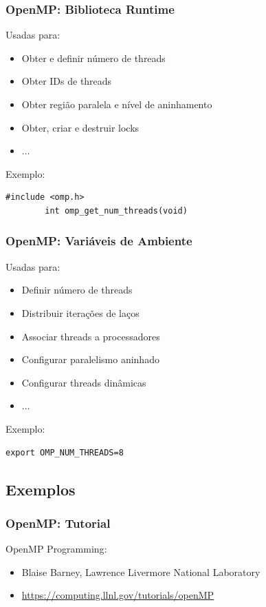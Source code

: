 \documentclass[10pt, compress]{beamer}
\begin{document}
\begin{frame}[fragile]
    \frametitle{OpenMP: Biblioteca Runtime}
    Usadas para:
    \begin{itemize}
        \item Obter e definir \alert{número de threads}
        \item Obter \alert{IDs de threads}
        \item Obter \alert{região paralela e nível de aninhamento}
        \item Obter, criar e destruir \alert{locks}
        \item $\dots$
    \end{itemize}

    Exemplo:
    \begin{lstlisting}[basicstyle=\ttfamily\scriptsize]
        #include <omp.h>
        int omp_get_num_threads(void)
    \end{lstlisting}
\end{frame}

\begin{frame}[fragile]
    \frametitle{OpenMP: Variáveis de Ambiente}
    Usadas para:
    \begin{itemize}
        \item Definir \alert{número de threads}
        \item Distribuir \alert{iterações de laços}
        \item Associar \alert{threads a processadores}
        \item Configurar \alert{paralelismo aninhado}
        \item Configurar \alert{threads dinâmicas}
        \item $\dots$
    \end{itemize}

    Exemplo:
    \begin{lstlisting}[basicstyle=\ttfamily\scriptsize]
        export OMP_NUM_THREADS=8
    \end{lstlisting}
\end{frame}

\subsection{Exemplos}

\begin{frame}
    \frametitle{OpenMP: Tutorial}
    \alert{OpenMP Programming}:
    \begin{itemize}
        \item Blaise Barney, Lawrence Livermore National Laboratory
        \item \url{https://computing.llnl.gov/tutorials/openMP}
    \end{itemize}
\end{frame}
\end{document}
